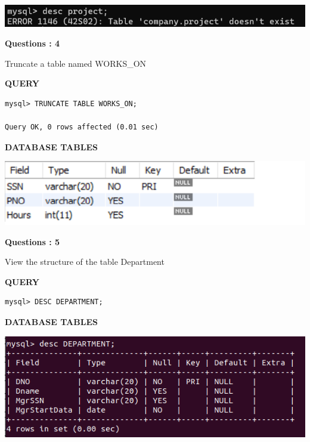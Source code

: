 \documentclass[a4paper,12pt]{report}
\begin{document}
\includegraphics[scale=0.8]{DROP.png}
	\newpage
\begin{flushleft}
    \textbf{Questions : 4}
\end{flushleft}
Truncate a table named WORKS\_ON
\begin{flushleft}
		\textbf{QUERY }
	\end{flushleft}
\begin{verbatim}
mysql> TRUNCATE TABLE WORKS_ON;

Query OK, 0 rows affected (0.01 sec)

\end{verbatim}

\begin{flushleft}
		\textbf{DATABASE TABLES}
\end{flushleft} 

\includegraphics[scale=1.1]{TRUNCATE.png}
\begin{flushleft}
    \textbf{Questions : 5}
\end{flushleft}
View the structure of the table Department
\begin{flushleft}
		\textbf{QUERY }
	\end{flushleft}
\begin{verbatim}
mysql> DESC DEPARTMENT;

\end{verbatim}

\begin{flushleft}
		\textbf{DATABASE TABLES}
\end{flushleft} 

\includegraphics[scale=0.6]{department.png}
\end{document}

